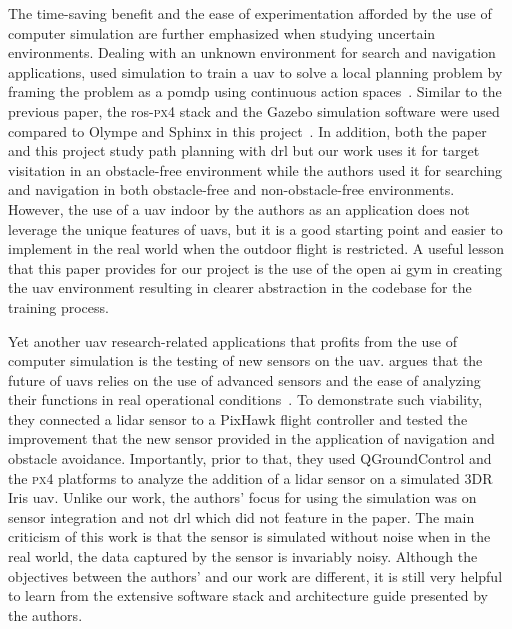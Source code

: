\documentclass[../main.tex]{subfiles}
\begin{document}
The time-saving benefit and the ease of experimentation 
afforded by the use of computer simulation are further emphasized 
when studying uncertain environments.
Dealing with an unknown environment for search and navigation applications,
\citeauthor{Wal19} used simulation to train a \gls{uav}
to solve a local planning problem
by framing the problem as 
a \gls{pomdp}
using continuous action spaces~\cite{Wal19}.
Similar to the previous paper, the \gls{ros}-\textsc{px4} stack 
and the Gazebo 
simulation software were used compared to Olympe and Sphinx 
in this project~\cite{Wal19}.
In addition, both the paper and this project study path planning 
with \gls{drl} but our work uses it for target visitation 
in an obstacle-free environment 
while the authors used it for searching and navigation
in both obstacle-free and non-obstacle-free environments.
However, the use of a \gls{uav} indoor by the authors as an application 
does not leverage the unique features of \glspl{uav}, 
but it is a good starting point 
and easier to implement in the real world 
when the outdoor flight is restricted.
A useful lesson that this paper provides for our project
is the use of the open \gls{ai} gym in creating the \gls{uav} environment
resulting in clearer abstraction in the codebase
for the training process.

Yet another \gls{uav} research-related applications 
that profits from the use of computer simulation 
is the testing of new sensors on the \gls{uav}.
\citeauthor{Gar20} argues that the future of \glspl{uav}
relies on the use of advanced sensors and 
the ease of analyzing their functions
in real operational conditions~\cite{Gar20}.
To demonstrate such viability, they connected a \gls{lidar} sensor
to a PixHawk flight controller and tested the improvement
that the new sensor provided
in the application of navigation and obstacle avoidance.
Importantly, prior to that, they used QGroundControl and the \textsc{px}4
platforms to analyze the addition of a \gls{lidar} sensor
on a simulated 3DR Iris \gls{uav}.
Unlike our work, the authors' focus for using the simulation
was on sensor integration and not \gls{drl} 
which did not feature in the paper. 
The main criticism of this work is that 
the sensor is simulated without noise
when in the real world, the data captured
by the sensor is invariably noisy.
Although the objectives between the authors' and our work
are different, it is still very helpful to learn from
the extensive software stack and architecture guide 
presented by the authors.
\end{document}
